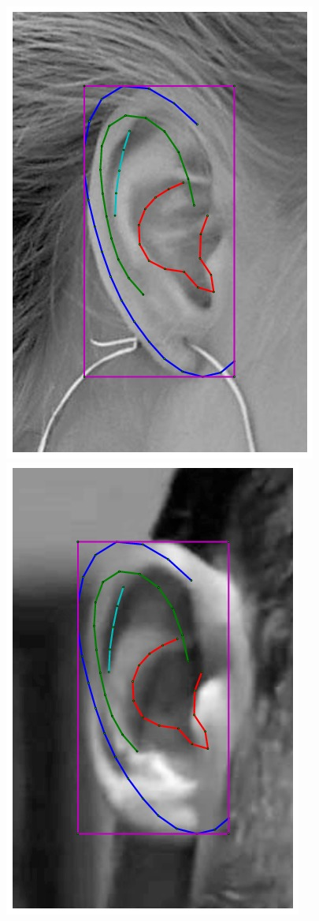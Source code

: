 \begin{figure}[!t]
    \includegraphics[height=\flowh]{resources/Ear_Deformable_Model/fittings/initial_0011}
    \includegraphics[height=\flowh]{resources/Ear_Deformable_Model/fittings/initial_0003}

\end{figure}
